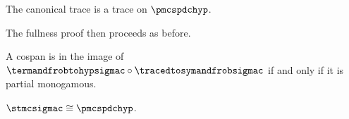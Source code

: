\begin{theorem}
    The canonical trace is a trace on \(\pmcspdchyp\).
\end{theorem}

The fullness proof then proceeds as before.

\begin{theorem}
    A cospan is in the image of
    \(\termandfrobtohypsigmac \circ \tracedtosymandfrobsigmac\) if and only if
    it is partial monogamous.
\end{theorem}

\begin{corollary}
    \(\stmcsigmac \cong \pmcspdchyp\).
\end{corollary}